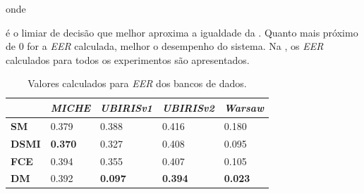 
\noindent onde 


\noindent é o limiar de decisão que melhor aproxima a igualdade da . Quanto mais próximo de 0 for a \textit{\acrshort{EER}} calculada, melhor o desempenho do sistema. Na , os \textit{\acrshort{EER}} calculados para todos os experimentos são apresentados.

\begin{table}[h!]
\centering
\caption{Valores calculados para \textit{\acrshort{EER}} dos bancos de dados.}
\label{tab:experimentos:eer}
\begin{tabular}{l|l|l|l|l|}
\cline{2-5}
 & \textit{\textbf{MICHE}} & \textit{\textbf{UBIRISv1}} & \textit{\textbf{UBIRISv2}} & \textit{\textbf{Warsaw}} \\ \hline
\multicolumn{1}{|l|}{\textbf{SM}} & 0.379 & 0.388 & 0.416 & 0.180 \\ \hline
\multicolumn{1}{|l|}{\textbf{DSMI}} & \textbf{0.370} & 0.327 & 0.408 & 0.095 \\ \hline
\multicolumn{1}{|l|}{\textbf{FCE}} & 0.394 & 0.355 & 0.407 & 0.105 \\ \hline
\multicolumn{1}{|l|}{\textbf{DM}} & 0.392 & \textbf{0.097} & \textbf{0.394} & \textbf{0.023} \\ \hline
\end{tabular}
\end{table}

